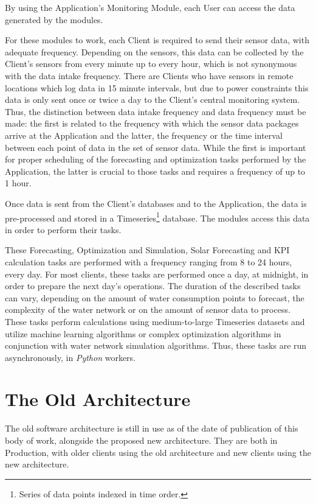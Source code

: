 By using the Application's Monitoring Module, each User can access the data generated by the modules.

For these modules to work, each Client is required to send their sensor data, with adequate frequency. Depending on the sensors, this data can be collected by the Client's sensors from every minute up to every hour, which is not synonymous with the data intake frequency. There are Clients who have sensors in remote locations which log data in 15 minute intervals, but due to power constraints this data is only sent once or twice a day to the Client's central monitoring system. Thus, the distinction between data intake frequency and data frequency must be made: the first is related to the frequency with which the sensor data packages arrive at the Application and the latter, the frequency or the time interval between each point of data in the set of sensor data. While the first is important for proper scheduling of the forecasting and optimization tasks performed by the Application, the latter is crucial to those tasks and requires a frequency of up to 1 hour. 

Once data is sent from the Client's databases and to the Application, the data is pre-processed and stored in a Timeseries\footnote{Series of data points indexed in time order.}\label{foot:timeseries} database. The modules access this data in order to perform their tasks. 

These Forecasting, Optimization and Simulation, Solar Forecasting and KPI calculation tasks are performed with a frequency ranging from 8 to 24 hours, every day. For most clients, these tasks are performed once a day, at midnight, in order to prepare the next day's operations. The duration of the described tasks can vary, depending on the amount of water consumption points to forecast, the complexity of the water network or on the amount of sensor data to process. These tasks perform calculations using medium-to-large Timeseries datasets and utilize machine learning algorithms or complex optimization algorithms in conjunction with water network simulation algorithms. Thus, these tasks are run asynchronously, in \textit{Python} workers.



\section{The Old Architecture}\label{methodology:s:the-old-architecture}

The old software architecture is still in use as of the date of publication of this body of work, alongside the proposed new architecture. They are both in Production, with older clients using the old architecture and new clients using the new architecture. 

